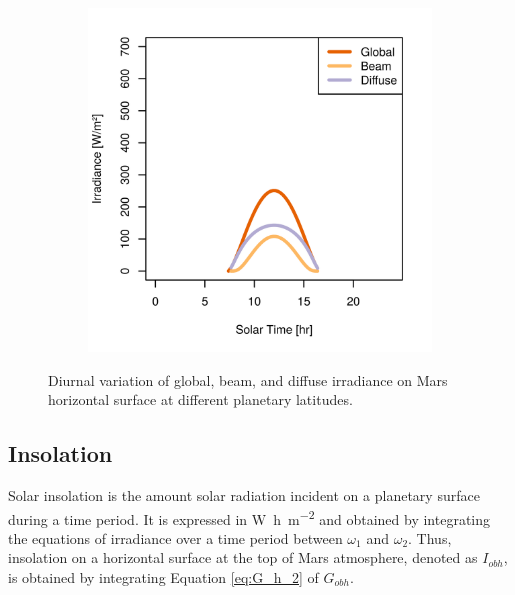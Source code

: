 \begin{figure}[h]
\begin{subfigure}[t]{\subfigureWidth}
  		\label{fig:sub:irradiance-phi-p20}
  	\end{subfigure}\hfill
	   \begin{subfigure}[t]{\subfigureWidth}
      \centering
  		\includegraphics[height=\graphicsHeight]{sections/martian-environment/plots/gh-gbh-gdh-variation-4-for-ls-248-phi-40-tau-05-and-albedo-027.png}
  		\label{fig:sub:irradiance-phi-p40}
	   \end{subfigure}\hfill
	\caption{Diurnal variation of global, beam, and diffuse irradiance on Mars horizontal surface at different planetary latitudes.}
	\label{fig:plot:irradiances-phi}
\vspace{-2ex}
\end{figure}

\clearpage
\subsection{Insolation}
\label{sec:MartianEnvironment:SolarRadiation:Insolation}

Solar insolation is the amount solar radiation incident on a planetary surface during a time period. It is expressed in \si{\watt\hour\per\meter\squared} and obtained by integrating the equations of irradiance over a time period between $\omega_1$ and $\omega_2$. Thus, insolation on a horizontal surface at the top of Mars atmosphere, denoted as $I_{obh}$, is obtained by integrating Equation \ref{eq:G_h_2} of $G_{obh}$.

